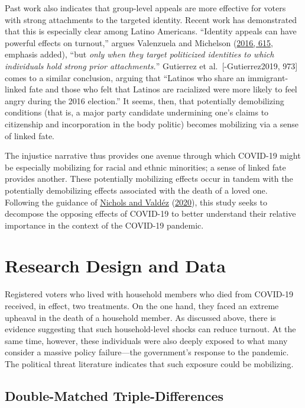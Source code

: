\documentclass[
  12pt,
]{article}
\begin{document}
Past work also indicates that group-level appeals are more effective for voters with strong attachments to the targeted identity. Recent work has demonstrated that this is especially clear among Latino Americans. ``Identity appeals can have powerful effects on turnout,'' argues Valenzuela and Michelson (\protect\hyperlink{ref-Valenzuela2016}{2016, 615}, emphasis added), ``but \emph{only when they target politicized identities to which individuals hold strong prior attachments.}'' Gutierrez et al.~{[}-Gutierrez2019, 973{]} comes to a similar conclusion, arguing that ``Latinos who share an immigrant-linked fate and those who felt that Latinos are racialized were more likely to feel angry during the 2016 election.'' It seems, then, that potentially demobilizing conditions (that is, a major party candidate undermining one's claims to citizenship and incorporation in the body politic) becomes mobilizing via a sense of linked fate.

The injustice narrative thus provides one avenue through which COVID-19 might be especially mobilizing for racial and ethnic minorities; a sense of linked fate provides another. These potentially mobilizing effects occur in tandem with the potentially demobilizing effects associated with the death of a loved one. Following the guidance of \protect\hyperlink{ref-Nichols2020a}{Nichols and Valdéz} (\protect\hyperlink{ref-Nichols2020a}{2020}), this study seeks to decompose the opposing effects of COVID-19 to better understand their relative importance in the context of the COVID-19 pandemic.

\hypertarget{research-design-and-data}{%
\section*{Research Design and Data}\label{research-design-and-data}}

Registered voters who lived with household members who died from COVID-19 received, in effect, two treatments. On the one hand, they faced an extreme upheaval in the death of a household member. As discussed above, there is evidence suggesting that such household-level shocks can reduce turnout. At the same time, however, these individuals were also deeply exposed to what many consider a massive policy failure---the government's response to the pandemic. The political threat literature indicates that such exposure could be mobilizing.

\hypertarget{double-matched-triple-differences}{%
\subsection*{Double-Matched Triple-Differences}\label{double-matched-triple-differences}}
\end{document}
